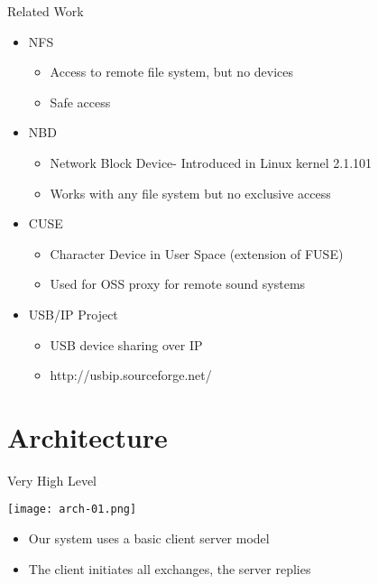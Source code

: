 \documentclass[handout]{beamer}
\begin{document}
\begin{frame}{Related Work}
  \begin{itemize}
  \item NFS \cite{nfs-source}
    \begin{itemize}
    \item Access to remote file system, but no devices
    \item Safe access
    \end{itemize}
  \item NBD \cite{nbd-source}
    \begin{itemize}
    \item Network Block Device- Introduced in Linux kernel 2.1.101
    \item Works with any file system but no exclusive access 
    \end{itemize}
  \item CUSE \cite{cuse-article}
    \begin{itemize}
    \item Character Device in User Space (extension of FUSE)
    \item Used for OSS proxy for remote sound systems
    \end{itemize}
  \item USB/IP Project
    \begin{itemize}
    \item USB device sharing over IP
    \item http://usbip.sourceforge.net/
    \end{itemize}
  \end{itemize}
\end{frame}


\section{Architecture}

\begin{frame}[c]{Very High Level}
  \begin{center}
    \texttt{[image: arch-01.png]}
  \end{center}

  \begin{itemize}
    \item<1-> Our system uses a basic client server model
    \item<2-> The client initiates all exchanges, the server replies
  \end{itemize}
\end{frame}
\end{document}
